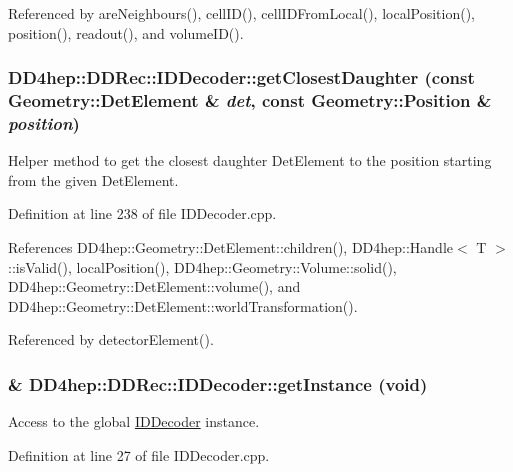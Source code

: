 Referenced by areNeighbours(), cellID(), cellIDFromLocal(), localPosition(), position(), readout(), and volumeID().\hypertarget{class_d_d4hep_1_1_d_d_rec_1_1_i_d_decoder_a7ff69a5376066763ee49fdf228a362b3}{
\subsubsection[{getClosestDaughter}]{ DD4hep::DDRec::IDDecoder::getClosestDaughter (const {\bf Geometry::DetElement} \& {\em det}, \/  const {\bf Geometry::Position} \& {\em position})}}
\label{class_d_d4hep_1_1_d_d_rec_1_1_i_d_decoder_a7ff69a5376066763ee49fdf228a362b3}


Helper method to get the closest daughter DetElement to the position starting from the given DetElement. 

Definition at line 238 of file IDDecoder.cpp.

References DD4hep::Geometry::DetElement::children(), DD4hep::Handle$<$ T $>$::isValid(), localPosition(), DD4hep::Geometry::Volume::solid(), DD4hep::Geometry::DetElement::volume(), and DD4hep::Geometry::DetElement::worldTransformation().

Referenced by detectorElement().\hypertarget{class_d_d4hep_1_1_d_d_rec_1_1_i_d_decoder_a9a7ec8c15a97dad8bdbc0743bb534c3f}{
\subsubsection[{getInstance}]{ \& DD4hep::DDRec::IDDecoder::getInstance (void)}}
\label{class_d_d4hep_1_1_d_d_rec_1_1_i_d_decoder_a9a7ec8c15a97dad8bdbc0743bb534c3f}


Access to the global \hyperlink{class_d_d4hep_1_1_d_d_rec_1_1_i_d_decoder}{IDDecoder} instance. 

Definition at line 27 of file IDDecoder.cpp.

